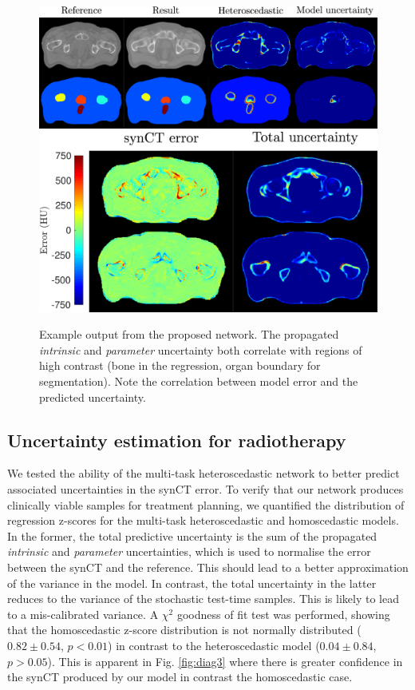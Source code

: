 \begin{figure}[!t]
	\centering
	{\includegraphics[height=0.21\textwidth]{chapter_5/figures/new_figure_1a.pdf}}%
	\hspace{3pt}
	{\includegraphics[height=0.21\textwidth]{chapter_5/figures/new_figure_1b.pdf}}%
	\caption{Example output from the proposed network. The propagated \textit{intrinsic} and \textit{parameter} uncertainty both correlate with regions of high contrast (bone in the regression, organ boundary for segmentation). Note the correlation between model error and the predicted uncertainty.}
	\label{fig:diagram2}
\end{figure}


\subsection{Uncertainty estimation for radiotherapy}
We tested the ability of the multi-task heteroscedastic network to better predict associated uncertainties in the synCT error. To verify that our network produces clinically viable samples for treatment planning, we quantified the distribution of regression z-scores for the multi-task heteroscedastic and homoscedastic models. In the former, the total predictive uncertainty is the sum of the propagated \emph{intrinsic} and \emph{parameter} uncertainties, which is used to normalise the error between the synCT and the reference. This should lead to a better approximation of the variance in the model. In contrast, the total uncertainty in the latter reduces to the variance of the stochastic test-time samples. This is likely to lead to a mis-calibrated variance. A $\chi^{2}$ goodness of fit test was performed, showing that the homoscedastic z-score distribution is not normally distributed ($0.82 \pm 0.54$, $p<0.01$) in contrast to the heteroscedastic model ($0.04 \pm 0.84$, $p>0.05$). This is apparent in Fig. \ref{fig:diag3} where there is greater confidence in the synCT produced by our model in contrast the homoscedastic case.

